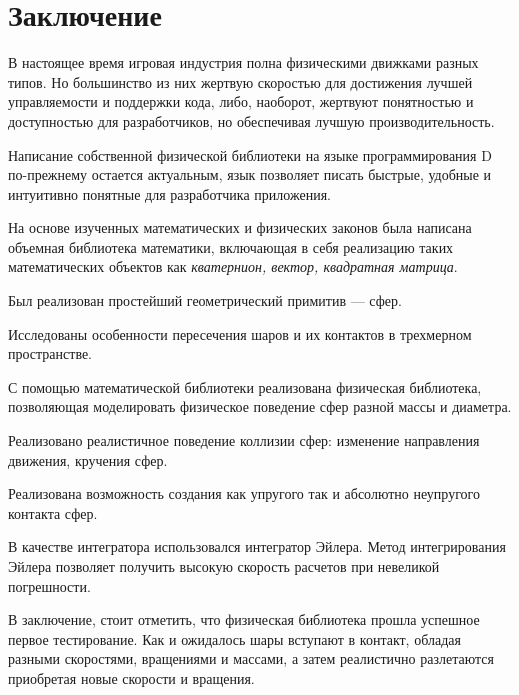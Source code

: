 \chapter*{Заключение}

В настоящее время игровая индустрия полна физическими движками разных типов. Но большинство из них жертвую скоростью 
для достижения лучшей управляемости и поддержки кода, либо, наоборот, жертвуют понятностью и доступностью для разработчиков,
но обеспечивая лучшую производительность.

Написание собственной физической библиотеки на языке программирования D по-прежнему остается актуальным,
язык позволяет писать быстрые, удобные и интуитивно понятные для разработчика приложения.

На основе изученных математических и физических законов была написана объемная библиотека математики,
включающая в себя реализацию таких математических объектов как \textit{кватернион, вектор, квадратная матрица}.

Был реализован простейший геометрический примитив --- сфер.

Исследованы особенности пересечения шаров и их контактов в трехмерном пространстве. 

С помощью математической библиотеки реализована физическая библиотека, позволяющая моделировать физическое поведение
сфер разной массы и диаметра.

Реализовано реалистичное поведение коллизии сфер: изменение направления движения, кручения сфер.

Реализована возможность создания как упругого так и абсолютно неупругого контакта сфер.

В качестве интегратора использовался интегратор Эйлера. Метод интегрирования Эйлера позволяет получить высокую скорость расчетов
при невеликой погрешности.

В заключение, стоит отметить, что физическая библиотека прошла успешное первое тестирование. Как и ожидалось шары вступают в контакт,
обладая разными скоростями, вращениями и массами, а затем реалистично разлетаются приобретая новые скорости и вращения.